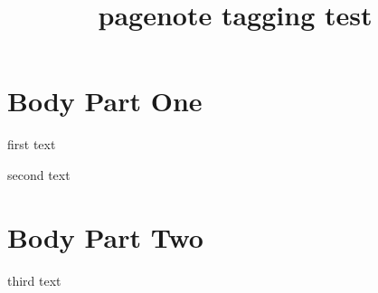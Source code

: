 \documentclass{report}
\title{pagenote tagging test}
\begin{document}
\chapter{Body Part One}

first text

second text

\printnotes*

\chapter{Body Part Two}

third text

\printnotes*
\end{document}
